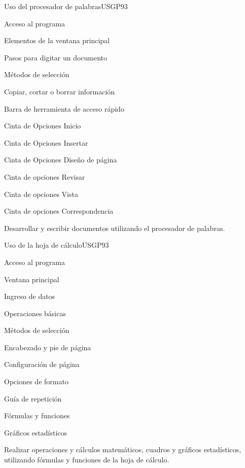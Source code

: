 \begin{syllabus}
\begin{unit}{Uso del procesador de palabras}{USGP}{9}{3}
\begin{topics}
      \item Acceso al programa
      \item Elementos de la ventana principal
      \item Pasos para digitar un documento
      \item Métodos de selección
      \item Copiar, cortar o borrar información
      \item Barra de herramienta de acceso rápido
      \item Cinta de Opciones Inicio
      \item Cinta de Opciones Insertar
      \item Cinta de Opciones Diseño de página
      \item Cinta de opciones Revisar
      \item Cinta de opciones Vista
      \item Cinta de opciones Correspondencia
\end{topics}
\begin{learningoutcomes}
   \item Desarrollar y escribir documentos utilizando el procesador de palabras.
\end{learningoutcomes}
\end{unit}

\begin{unit}{Uso de la hoja de cálculo}{USGP}{9}{3}
\begin{topics}
      \item Acceso al programa
      \item Ventana principal
      \item Ingreso de datos 
      \item Operaciones básicas 
      \item Métodos de selección 
      \item Encabezado y pie de página 
      \item Configuración de página 
      \item Opciones de formato 
      \item Guía de repetición
      \item Fórmulas y funciones 
      \item Gráficos estadísticos
\end{topics}
\begin{learningoutcomes}
   \item Realizar operaciones y cálculos matemáticos, cuadros y gráficos estadísticos, utilizando fórmulas y funciones de la hoja de cálculo.
\end{learningoutcomes}
\end{unit}


\end{syllabus}
